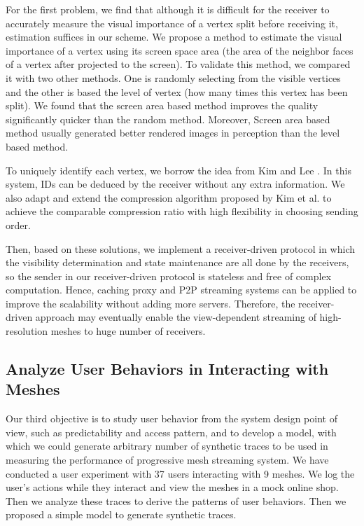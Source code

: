     For the first problem, we find that although it is difficult
    for the receiver to accurately measure
    the visual importance of a vertex split before receiving it, 
    estimation suffices in our scheme. 
    We propose a method to estimate the visual importance of a vertex
    using its screen space area (the area of the neighbor faces
    of a vertex after projected to the screen).
    To validate this method, we compared it with two other
    methods. One is randomly selecting from the visible vertices and 
    the other is based the level of vertex (how many times this vertex
    has been split). We found that the screen area based method improves
    the quality significantly quicker than the random method. Moreover,
    Screen area based method usually generated better rendered images in perception
    than the level based method.
    
    To uniquely identify each vertex, we borrow the idea from Kim and Lee \cite{kim01truly}.
    In this system, IDs can be deduced by the receiver without any extra information. 
    We also adapt and extend the compression algorithm proposed by Kim et al. \cite{multiresolution:kim}
    to achieve the comparable compression ratio with high flexibility in choosing 
    sending order.
    
    Then, based on these solutions, we implement a receiver-driven protocol in which 
    the visibility determination and state maintenance are all done by the receivers, so 
    the sender in our receiver-driven protocol is stateless and free of complex computation.
    Hence, caching proxy and P2P streaming systems can be applied to improve
    the scalability without adding more servers.  
    Therefore, the receiver-driven approach may eventually
    enable the view-dependent streaming of high-resolution meshes to huge number of receivers.
    
    \subsection{Analyze User Behaviors in Interacting with Meshes}
    Our third objective is to study user behavior from the system design point of view, 
    such as predictability and access pattern, and to develop a model, with which we
    could generate arbitrary number of synthetic traces to be used in measuring the performance
    of progressive mesh streaming system.
    We have conducted a user experiment with 37 users interacting with 9 meshes.
    We log the user's actions while they interact and view the meshes in a mock online shop.
    Then we analyze these traces to derive the patterns of user behaviors. Then we proposed
    a simple model to generate synthetic traces.

